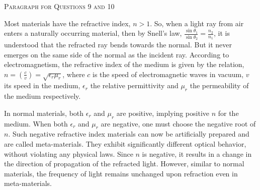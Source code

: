 

\begin{center}
    \textsc{Paragraph for Questions 9 and 10}
\end{center}

Most materials have the refractive index, \( n > 1 \). So, when a light ray from air enters a naturally occurring material, then by Snell's law, \(\frac{\sin \theta_1}{\sin \theta_2} = \frac{n_2}{n_1}\), it is understood that the refracted ray bends towards the normal. But it never emerges on the same side of the normal as the incident ray. According to electromagnetism, the refractive index of the medium is given by the relation, \(n = \left( \frac{c}{v} \right) = \sqrt{\epsilon_r \mu_r}\), where \(c\) is the speed of electromagnetic waves in vacuum, \(v\) its speed in the medium, \(\epsilon_r\) the relative permittivity and \(\mu_r\) the permeability of the medium respectively.

In normal materials, both \(\epsilon_r\) and \(\mu_r\) are positive, implying positive \(n\) for the medium. When both \(\epsilon_r\) and \(\mu_r\) are negative, one must choose the negative root of \(n\). Such negative refractive index materials can now be artificially prepared and are called meta-materials. They exhibit significantly different optical behavior, without violating any physical laws. Since \(n\) is negative, it results in a change in the direction of propagation of the refracted light. However, similar to normal materials, the frequency of light remains unchanged upon refraction even in meta-materials.

\begin{center}
\end{center} 

